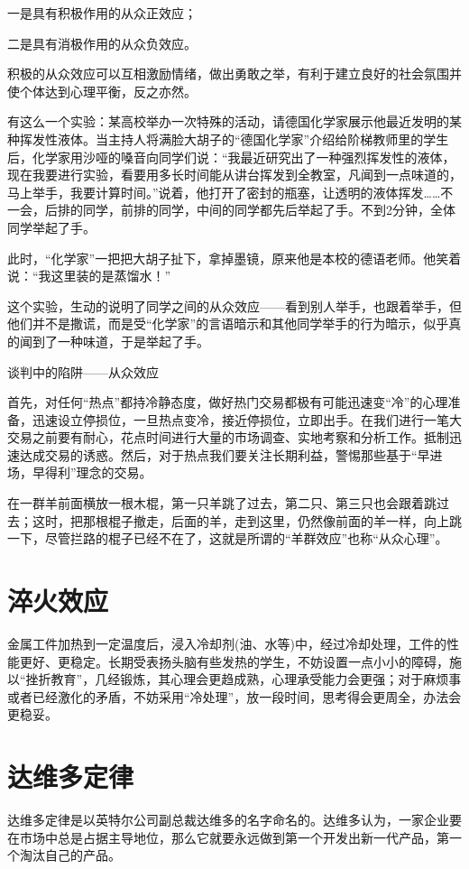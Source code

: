 \documentclass[11pt]{ctexart}
\begin{document}
一是具有积极作用的从众正效应；

二是具有消极作用的从众负效应。

积极的从众效应可以互相激励情绪，做出勇敢之举，有利于建立良好的社会氛围并使个体达到心理平衡，反之亦然。

有这么一个实验：某高校举办一次特殊的活动，请德国化学家展示他最近发明的某种挥发性液体。当主持人将满脸大胡子的“德国化学家”介绍给阶梯教师里的学生后，化学家用沙哑的嗓音向同学们说：“我最近研究出了一种强烈挥发性的液体，现在我要进行实验，看要用多长时间能从讲台挥发到全教室，凡闻到一点味道的，马上举手，我要计算时间。”说着，他打开了密封的瓶塞，让透明的液体挥发……不一会，后排的同学，前排的同学，中间的同学都先后举起了手。不到2分钟，全体同学举起了手。

此时，“化学家”一把把大胡子扯下，拿掉墨镜，原来他是本校的德语老师。他笑着说：“我这里装的是蒸馏水！”

这个实验，生动的说明了同学之间的从众效应——看到别人举手，也跟着举手，但他们并不是撒谎，而是受“化学家”的言语暗示和其他同学举手的行为暗示，似乎真的闻到了一种味道，于是举起了手。

谈判中的陷阱——从众效应

首先，对任何“热点”都持冷静态度，做好热门交易都极有可能迅速变“冷”的心理准备，迅速设立停损位，一旦热点变冷，接近停损位，立即出手。在我们进行一笔大交易之前要有耐心，花点时间进行大量的市场调查、实地考察和分析工作。抵制迅速达成交易的诱惑。然后，对于热点我们要关注长期利益，警惕那些基于“早进场，早得利”理念的交易。

在一群羊前面横放一根木棍，第一只羊跳了过去，第二只、第三只也会跟着跳过去；这时，把那根棍子撤走，后面的羊，走到这里，仍然像前面的羊一样，向上跳一下，尽管拦路的棍子已经不在了，这就是所谓的“羊群效应”也称“从众心理”。
\section{淬火效应}
\label{sec-24}


金属工件加热到一定温度后，浸入冷却剂(油、水等)中，经过冷却处理，工件的性能更好、更稳定。长期受表扬头脑有些发热的学生，不妨设置一点小小的障碍，施以“挫折教育”，几经锻炼，其心理会更趋成熟，心理承受能力会更强；对于麻烦事或者已经激化的矛盾，不妨采用“冷处理”，放一段时间，思考得会更周全，办法会更稳妥。
\section{达维多定律}
\label{sec-25}


达维多定律是以英特尔公司副总裁达维多的名字命名的。达维多认为，一家企业要在市场中总是占据主导地位，那么它就要永远做到第一个开发出新一代产品，第一个淘汰自己的产品。
\end{document}
